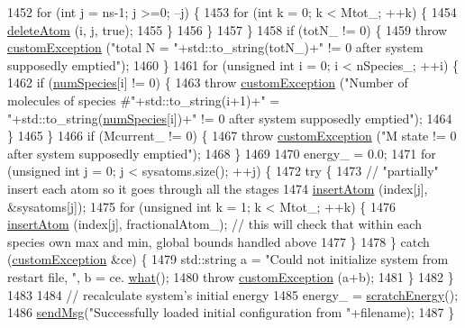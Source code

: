 \begin{DoxyCode}
1452         \textcolor{keywordflow}{for} (\textcolor{keywordtype}{int} j = ns-1; j >=0; --j) \{
1453             \textcolor{keywordflow}{for} (\textcolor{keywordtype}{int} k = 0; k < Mtot\_; ++k) \{
1454                 \hyperlink{classsim_system_acabf4fc5b5b90bba62e1449ddb3646c6}{deleteAtom} (i, j, \textcolor{keyword}{true});
1455             \}
1456         \}
1457     \}
1458     \textcolor{keywordflow}{if} (totN\_ != 0) \{
1459         \textcolor{keywordflow}{throw} \hyperlink{classcustom_exception}{customException} (\textcolor{stringliteral}{"total N = "}+std::to\_string(totN\_)+\textcolor{stringliteral}{" != 0 after system
       supposedly emptied"});
1460     \}
1461     \textcolor{keywordflow}{for} (\textcolor{keywordtype}{unsigned} \textcolor{keywordtype}{int} i = 0; i < nSpecies\_; ++i) \{
1462         \textcolor{keywordflow}{if} (\hyperlink{classsim_system_a9eea865e6dc1cff377b1e79c4d9c23f0}{numSpecies}[i] != 0) \{
1463             \textcolor{keywordflow}{throw} \hyperlink{classcustom_exception}{customException} (\textcolor{stringliteral}{"Number of molecules of species #"}+std::to\_string(i+1)+\textcolor{stringliteral}{"
       = "}+std::to\_string(\hyperlink{classsim_system_a9eea865e6dc1cff377b1e79c4d9c23f0}{numSpecies}[i])+\textcolor{stringliteral}{" != 0 after system supposedly emptied"});
1464         \}
1465     \}
1466     \textcolor{keywordflow}{if} (Mcurrent\_ != 0) \{
1467         \textcolor{keywordflow}{throw} \hyperlink{classcustom_exception}{customException} (\textcolor{stringliteral}{"M state != 0 after system supposedly emptied"});
1468     \}
1469 
1470     energy\_ = 0.0;
1471     \textcolor{keywordflow}{for} (\textcolor{keywordtype}{unsigned} \textcolor{keywordtype}{int} j = 0; j < sysatoms.size(); ++j) \{
1472         \textcolor{keywordflow}{try} \{
1473             \textcolor{comment}{// "partially" insert each atom so it goes through all the stages}
1474             \hyperlink{classsim_system_a0404e9435cc046d19b6bb990678ee069}{insertAtom} (index[j], &sysatoms[j]);
1475             \textcolor{keywordflow}{for} (\textcolor{keywordtype}{unsigned} \textcolor{keywordtype}{int} k = 1; k < Mtot\_; ++k) \{
1476                 \hyperlink{classsim_system_a0404e9435cc046d19b6bb990678ee069}{insertAtom} (index[j], fractionalAtom\_); \textcolor{comment}{// this will check that within each
       species own max and min, global bounds handled above}
1477             \}
1478         \} \textcolor{keywordflow}{catch} (\hyperlink{classcustom_exception}{customException} &ce) \{
1479             std::string a = \textcolor{stringliteral}{"Could not initialize system from restart file, "}, b = ce.
      \hyperlink{classcustom_exception_aeb6ab5848b038adfc68fde86a512f691}{what}();
1480             \textcolor{keywordflow}{throw} \hyperlink{classcustom_exception}{customException} (a+b);
1481         \}
1482     \}
1483 
1484     \textcolor{comment}{// recalculate system's initial energy}
1485     energy\_ = \hyperlink{classsim_system_a51539ed4c3bb4905b32ce428c1c537fe}{scratchEnergy}();
1486     \hyperlink{utilities_8cpp_a08974c73a5b36c28b8ad1ef47fca77b0}{sendMsg}(\textcolor{stringliteral}{"Successfully loaded initial configuration from "}+filename);
1487 \}
\end{DoxyCode}
